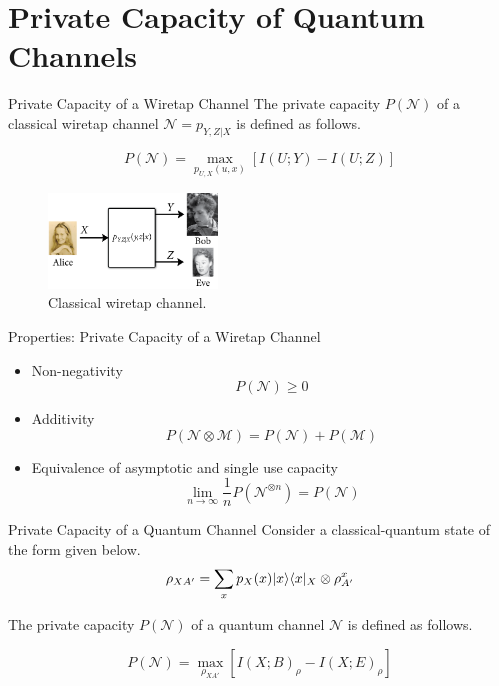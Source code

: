 \section{Private Capacity of Quantum Channels}

\begin{frame}{Private Capacity of a Wiretap Channel}
The private capacity $P(\mathcal{N})$ of a classical wiretap channel $\mathcal{N} = p_{Y,Z|X}$ is defined as follows.
\begin{tcolorbox}
$$P(\mathcal{N}) = \max_{p_{U,X}(u,x)} \left[ I(U;Y) - I(U;Z) \right]$$
\end{tcolorbox}

\begin{figure}
    \includegraphics[width=0.4\textwidth]{figures/wiretap_channel.png}
    \caption{Classical wiretap channel.}
\end{figure}
\end{frame}

\begin{frame}{Properties: Private Capacity of a Wiretap Channel}
\begin{itemize}
    \setlength{\itemsep}{1.5em}
    \item Non-negativity
    $$P(\mathcal{N}) \geq 0$$
    \item Additivity
    $$P(\mathcal{N} \otimes \mathcal{M}) = P(\mathcal{N}) + P(\mathcal{M})$$
    \item Equivalence of asymptotic and single use capacity
    $$\lim_{n \rightarrow \infty} \frac{1}{n} P(\mathcal{N}^{\otimes n}) = P(\mathcal{N})$$
\end{itemize}
\end{frame}

\begin{frame}{Private Capacity of a Quantum Channel}
Consider a classical-quantum state of the form given below.
$$\rho_{XA'} = \sum_{x} p_X(x) \lvert x\rangle\langle x\rvert_X \otimes \rho_{A'}^x $$

The private capacity $P(\mathcal{N})$ of a quantum channel $\mathcal{N}$ is defined as follows.
\begin{tcolorbox}
$$P(\mathcal{N}) = \max_{\rho_{XA'}} \left[ I(X;B)_\rho - I(X;E)_\rho \right]$$
\end{tcolorbox}
\end{frame}

